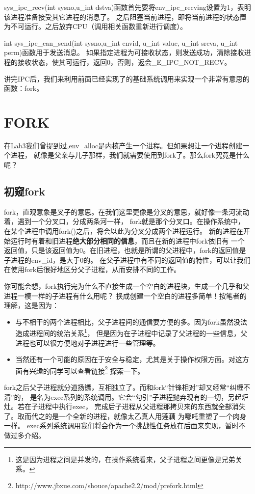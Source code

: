 sys\_ipc\_recv(int sysno,u\_int dstva)函数首先要将env\_ipc\_recving设置为1，表明该进程准备接受其它进程的消息了。
之后阻塞当前进程，即将当前进程的状态置为不可运行。之后放弃CPU（调用相关函数重新进行调度）。

int sys\_ipc\_can\_send(int sysno,u\_int envid, u\_int value, u\_int srcva, u\_int perm)函数用于发送消息。
如果指定进程为可接收状态，则发送成功，清除接收进程的接收状态，使其可运行，返回0，否则，返会\_E\_IPC\_NOT\_RECV。

讲完IPC后，我们来利用前面已经实现了的基础系统调用来实现一个非常有意思的函数：fork。

\section{FORK}

在Lab3我们曾提到过,env\_alloc是内核产生一个进程。但如果想让一个进程创建一个进程，
就像是父亲与儿子那样，我们就需要使用到fork了。那么fork究竟是什么呢？

\subsection{初窥fork}
fork，直观意象是叉子的意思。在我们这里更像是分叉的意思，就好像一条河流动着，遇到一个分叉口，分成两条河一样，
fork就是那个分叉口。在操作系统中，在某个进程中调用fork()之后，将会以此为分叉分成两个进程运行。
新的进程在开始运行时有着和旧进程\textbf{绝大部分相同的信息}，而且在新的进程中fork依旧有
一个返回值，只是该返回值为0。在旧进程，也就是所谓的父进程中，fork的返回值是子进程的env\_id，是大于0的。
在父子进程中有不同的返回值的特性，可以让我们在使用fork后很好地区分父子进程，从而安排不同的工作。

你可能会想，fork执行完为什么不直接生成一个空白的进程块，生成一个几乎和父进程一模一样的子进程有什么用呢？
换成创建一个空白的进程多简单！按笔者的理解，这是因为：
\begin{itemize}
 \item 与不相干的两个进程相比，父子进程间的通信要方便的多。因为fork虽然没法造成进程间的统治关系\footnote{这是因为进程之间是并发的，在操作系统看来，父子进程之间更像是兄弟关系。}，
但是因为在子进程中记录了父进程的一些信息，父进程也可以很方便地对子进程进行一些管理等。
 \item  当然还有一个可能的原因在于安全与稳定，尤其是关于操作权限方面。对这方面有兴趣的同学可以查看链接\footnote{http://www.jbxue.com/shouce/apache2.2/mod/prefork.html}
探索一下。
\end{itemize}

fork之后父子进程就分道扬镳，互相独立了。而和fork“针锋相对”却又经常“纠缠不清”的，
是名为exec系列的系统调用。它会“勾引”子进程抛弃现有的一切，另起炉灶。若在子进程中执行exec，
完成后子进程从父进程那拷贝来的东西就全部消失了。取而代之的是一个全新的进程，就像太乙真人用莲藕
为哪吒重塑了一个肉身一样。
exec系列系统调用我们将会作为一个挑战性任务放在后面来实现，暂时不做过多介绍。

